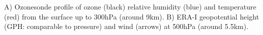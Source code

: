 \label{fig:MelbStormSonde}
A) Ozonesonde profile of ozone (black) relative humidity (blue) and temperature (red) from the surface up to 300hPa (around 9km).
B) ERA-I geopotential height (GPH: comparable to pressure) and wind (arrows) at 500hPa (around 5.5km).